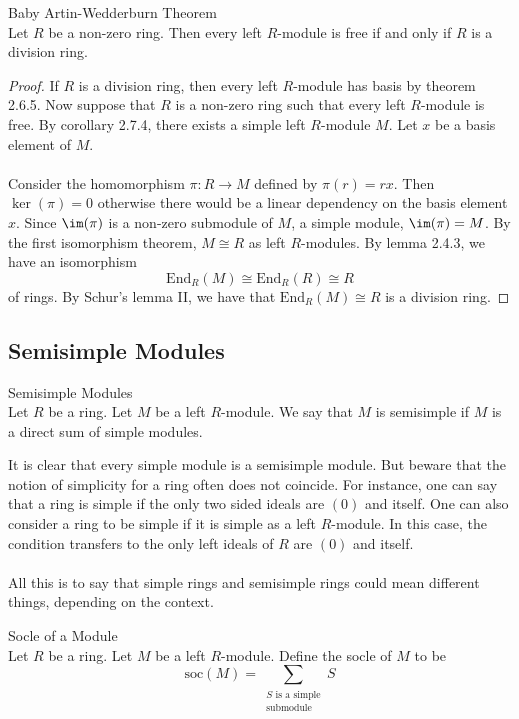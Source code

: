 \documentclass[a4paper]{article}
\begin{document}
\begin{thm}{Baby Artin-Wedderburn Theorem}{}\\
Let $R$ be a non-zero ring. Then every left $R$-module is free if and only if $R$ is a division ring. 
\begin{proof}
If $R$ is a division ring, then every left $R$-module has basis by theorem 2.6.5. Now suppose that $R$ is a non-zero ring such that every left $R$-module is free. By corollary 2.7.4, there exists a simple left $R$-module $M$. Let $x$ be a basis element of $M$. \\~\\

Consider the homomorphism $\pi:R\to M$ defined by $\pi(r)=rx$. Then $\ker(\pi)=0$ otherwise there would be a linear dependency on the basis element $x$. Since $\im(\pi)$ is a non-zero submodule of $M$, a simple module, $\im(\pi)=M$. By the first isomorphism theorem, $M\cong R$ as left $R$-modules. By lemma 2.4.3, we have an isomorphism $$\text{End}_R(M)\cong\text{End}_R(R)\cong R$$ of rings. By Schur's lemma II, we have that $\text{End}_R(M)\cong R$ is a division ring. 
\end{proof}
\end{thm}

\subsection{Semisimple Modules}
\begin{defn}{Semisimple Modules}{}\\
Let $R$ be a ring. Let $M$ be a left $R$-module. We say that $M$ is semisimple if $M$ is a direct sum of simple modules. 
\end{defn}

It is clear that every simple module is a semisimple module. But beware that the notion of simplicity for a ring often does not coincide. For instance, one can say that a ring is simple if the only two sided ideals are $(0)$ and itself. One can also consider a ring to be simple if it is simple as a left $R$-module. In this case, the condition transfers to the only left ideals of $R$ are $(0)$ and itself. \\~\\

All this is to say that simple rings and semisimple rings could mean different things, depending on the context. 

\begin{defn}{Socle of a Module}{}\\
Let $R$ be a ring. Let $M$ be a left $R$-module. Define the socle of $M$ to be $$\text{soc}(M)=\sum_{\substack{S\text{ is a simple}\\\text{submodule}}}S$$
\end{defn}
\end{document}
